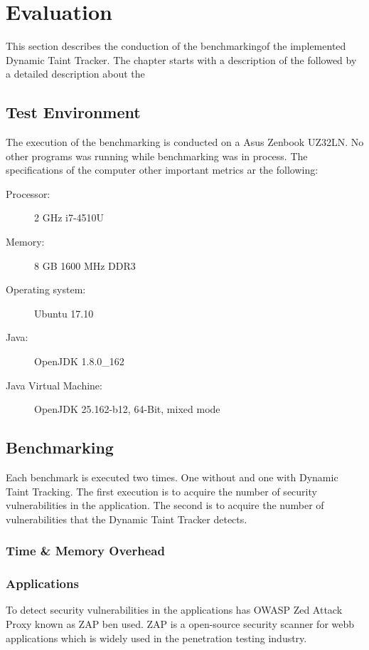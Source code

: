 \chapter{Evaluation}
This section describes the conduction of the benchmarkingof the implemented Dynamic Taint Tracker. The chapter starts with a description of the \textit{} followed by a detailed description about the \textit{}

\section{Test Environment}
\label{TestEnvironment}
The execution of the benchmarking is conducted on a Asus Zenbook UZ32LN. No other programs was running while benchmarking was in process. The specifications of the computer other important metrics ar the following:

\begin{description}
	\item [Processor:] 2 GHz i7-4510U
	\item [Memory:] 8 GB 1600 MHz DDR3
	\item [Operating system:] Ubuntu 17.10
	\item [Java:] OpenJDK 1.8.0\_162
	\item [Java Virtual Machine:] OpenJDK 25.162-b12, 64-Bit, mixed mode
\end{description}



\section{Benchmarking}
\label{Benchmarking}
Each benchmark is executed two times. One without and one with Dynamic Taint Tracking. The first execution is to acquire the number of security vulnerabilities in the application. The second is to acquire the number of vulnerabilities that the Dynamic Taint Tracker detects.



\subsection{Time \& Memory Overhead}



\subsection{Applications}
To detect security vulnerabilities in the applications has OWASP Zed Attack Proxy \parencite{zap} known as ZAP ben used. ZAP is a open-source security scanner for webb applications which is widely used in the penetration testing industry.

